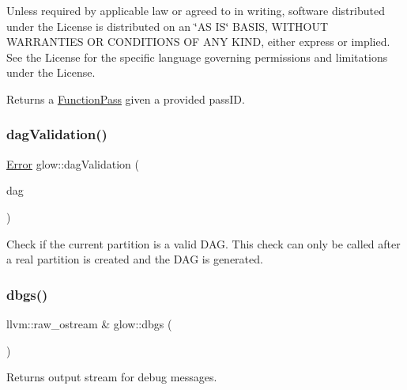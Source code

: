 Unless required by applicable law or agreed to in writing, software distributed under the License is distributed on an \char`\"{}\+A\+S I\+S\char`\"{} B\+A\+S\+IS, W\+I\+T\+H\+O\+UT W\+A\+R\+R\+A\+N\+T\+I\+ES OR C\+O\+N\+D\+I\+T\+I\+O\+NS OF A\+NY K\+I\+ND, either express or implied. See the License for the specific language governing permissions and limitations under the License. \begin{DoxyReturn}{Returns}
a \hyperlink{classglow_1_1_function_pass}{Function\+Pass} given a provided {\ttfamily pass\+ID}. 
\end{DoxyReturn}
\mbox{\label{namespaceglow_ad40999bf88c854e1ca4bcbfa9efbd119}} 
\subsubsection{\texorpdfstring{dag\+Validation()}{dagValidation()}}
{\footnotesize\ttfamily \hyperlink{namespaceglow_afdb176c3a672ef66db0ecfc19a8d39bf}{Error} glow\+::dag\+Validation (\begin{DoxyParamCaption}\item[{const \hyperlink{structglow_1_1runtime_1_1_d_a_g}{D\+AG} \&}]{dag }\end{DoxyParamCaption})}

Check if the current partition is a valid D\+AG. This check can only be called after a real partition is created and the D\+AG is generated. \mbox{\label{namespaceglow_a64763ac9b2b790fea832124d0b2d401a}} 
\subsubsection{\texorpdfstring{dbgs()}{dbgs()}}
{\footnotesize\ttfamily llvm\+::raw\+\_\+ostream \& glow\+::dbgs (\begin{DoxyParamCaption}{ }\end{DoxyParamCaption})}

\begin{DoxyReturn}{Returns}
output stream for debug messages. 
\end{DoxyReturn}
\mbox{\label{namespaceglow_a8d2a21b045e4c1595f1da56d34750169}} 
